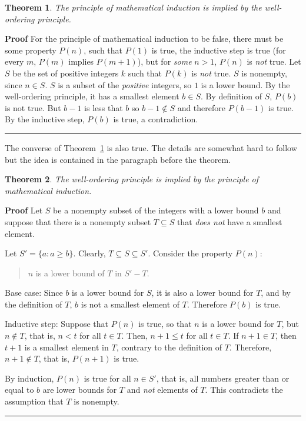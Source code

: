 \documentclass[11pt,a4paper]{report}
\newcommand*{\qed}{\hfill\rule{1ex}{1.5ex}}
\newtheorem{theorem}{Theorem}
\begin{document}
\begin{theorem}\label{th.wop}
The principle of mathematical induction is implied by the well-ordering principle.
\end{theorem}

\textbf{Proof} For the principle of mathematical induction to be false, there must be some property $P(n)$, such that $P(1)$ is true, the inductive step is true (for every $m$, $P(m)$ implies $P(m+1)$), but for \emph{some} $n>1$, $P(n)$ is \emph{not} true. Let $S$ be the set of positive integers $k$ such that $P(k)$ is \emph{not} true. $S$ is nonempty, since $n\in S$. $S$ is a subset of the \emph{positive} integers, so $1$ is a lower bound. By the well-ordering principle, it has a smallest element $b\in S$. By definition of $S$, $P(b)$ is not true. But $b-1$ is less that $b$ so $b-1\not\in S$ and therefore $P(b-1)$ is true. By the inductive step, $P(b)$ is true, a contradiction.\qed

\medskip

The converse of Theorem~\ref{th.wop} is also true. The details are somewhat hard to follow but the idea is contained in the paragraph before the theorem.

\begin{theorem}
The well-ordering principle is implied by the principle of mathematical induction.
\end{theorem}

\textbf{Proof} Let $S$ be a nonempty subset of the integers with a lower bound $b$ and suppose that there is a nonempty subset $T\subseteq S$ that \emph{does not} have a smallest element.

Let $S'=\{a:a\geq b\}$. Clearly, $T\subseteq S \subseteq S'$. Consider the property $P(n)$:
\begin{quote}
$n$ is a lower bound of $T$ in $S'-T$.
\end{quote}
Base case: Since $b$ is a lower bound for $S$, it is also a lower bound for $T$, and by the definition of $T$, $b$ is not a smallest element of $T$. Therefore $P(b)$ is true.

Inductive step: Suppose that $P(n)$ is true, so that $n$ is a lower bound for $T$, but $n\not\in T$, that is, $n<t$ for all $t\in T$. Then, $n+1\leq t$ for all $t \in T$. If $n+1\in T$, then $t+1$ is a smallest element in $T$, contrary to the definition of $T$. Therefore, $n+1\not\in T$, that is, $P(n+1)$ is true.

By induction, $P(n)$ is true for all $n\in S'$, that is, all numbers greater than or equal to $b$ are lower bounds for $T$ and \emph{not} elements of $T$. This contradicts the assumption that $T$ is nonempty.\qed
\end{document}
